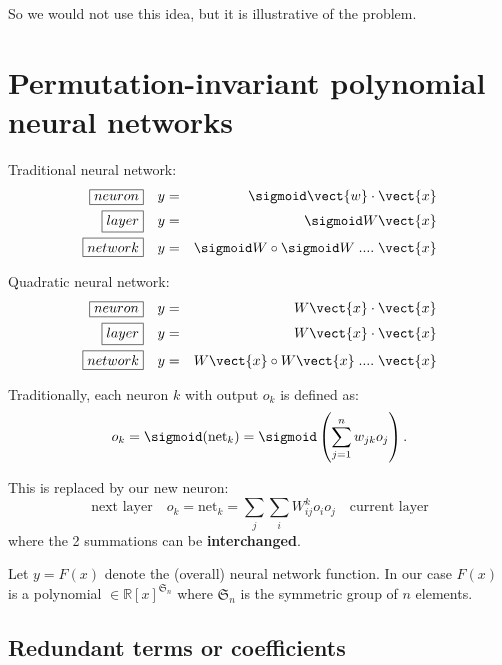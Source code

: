 So we would not use this idea, but it is illustrative of the problem.

\section{Permutation-invariant polynomial neural networks}

Traditional neural network:
\begin{eqnarray}
\boxed{neuron} \quad & y = & \sigmoid \vect{w} \cdot \vect{x} \nonumber \\
\boxed{layer} \quad & y = & \sigmoid W \vect{x} \nonumber \\
\boxed{network} \quad & y = & \sigmoid W \circ \sigmoid W \; .... \; \vect{x} 
\end{eqnarray}

Quadratic neural network:
\begin{eqnarray}
\boxed{neuron} \quad & y = & W \vect{x} \cdot \vect{x} \nonumber \\
\boxed{layer} \quad & y = & W \vect{x} \cdot \vect{x} \nonumber \\
\boxed{network} \quad & y = & W \vect{x} \circ W \vect{x} \; .... \; \vect{x} 
\end{eqnarray}

Traditionally, each neuron $k$ with output $o_k$ is defined as:
\begin{equation}
o_k = \sigmoid ({\text{net}}_k) = \sigmoid \left(\sum _{j=1}^{n} w_{jk} o_j \right) .
\end{equation}

This is replaced by our new neuron:
\begin{equation}
\boxed{\mbox{next layer}} \quad
o_k = {\text{net}}_k = \sum_j \sum_i W_{ij}^k o_i o_j
\quad \boxed{\mbox{current layer}}
\end{equation}
where the 2 summations can be \textbf{interchanged}.

Let $y = F(x)$ denote the (overall) neural network function.  In our case $F(x)$ is a polynomial $\in \mathbb{R}[x]^{\mathfrak{S}_n}$ where $\mathfrak{S}_n$ is the symmetric group of $n$ elements.

\subsection{Redundant terms or coefficients}
\label{redundant-weights}


